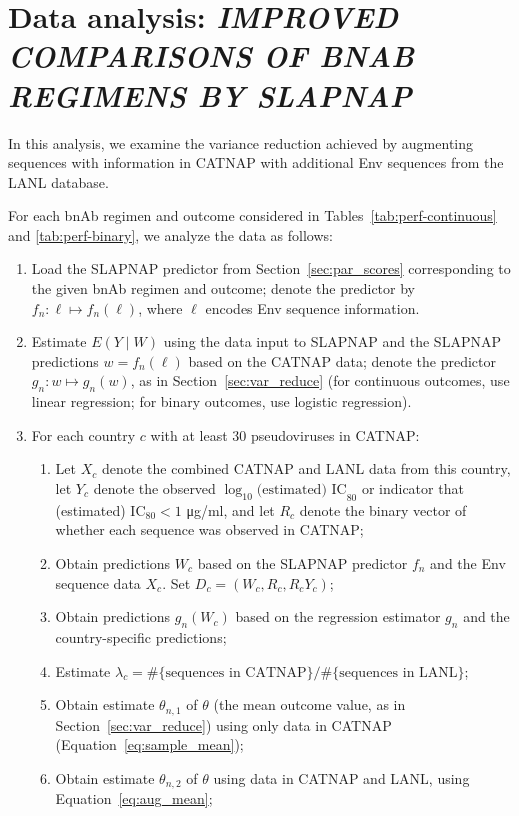 \documentclass[10pt]{article}
\begin{document}
\section{Data analysis: \textit{IMPROVED COMPARISONS OF BNAB REGIMENS BY SLAPNAP}}

In this analysis, we examine the variance reduction achieved by augmenting sequences with information in CATNAP with additional Env sequences from the LANL database.

For each bnAb regimen and outcome considered in Tables~\ref{tab:perf-continuous} and \ref{tab:perf-binary}, we analyze the data as follows:
\begin{enumerate}
  \item Load the SLAPNAP predictor from Section~\ref{sec:par_scores} corresponding to the given bnAb regimen and outcome; denote the predictor by $f_n: \ell \mapsto f_n(\ell)$, where $\ell$ encodes Env sequence information.
  \item Estimate $E(Y \mid W)$ using the data input to SLAPNAP and the SLAPNAP predictions $w = f_n(\ell)$ based on the CATNAP data; denote the predictor $g_n: w \mapsto g_n(w)$, as in Section~\ref{sec:var_reduce} (for continuous outcomes, use linear regression; for binary outcomes, use logistic regression).
  \item For each country $c$ with at least 30 pseudoviruses in CATNAP:
  \begin{enumerate}
    \item Let $X_c$ denote the combined CATNAP and LANL data from this country, let $Y_c$ denote the observed $\log_{10} \text{(estimated) IC}_{80}$ or indicator that (estimated) IC$_{80} < 1$ \si{\ug}/ml, and let $R_c$ denote the binary vector of whether each sequence was observed in CATNAP;
    \item Obtain predictions $W_c$ based on the SLAPNAP predictor $f_n$ and the Env sequence data $X_c$. Set $D_c = (W_c, R_c, R_cY_c)$;
    \item Obtain predictions $g_n(W_c)$ based on the regression estimator $g_n$ and the country-specific predictions;
    \item Estimate $\lambda_c = \#\{\text{sequences in CATNAP}\} / \#\{\text{sequences in LANL}\}$;
    \item Obtain estimate $\theta_{n,1}$ of $\theta$ (the mean outcome value, as in Section~\ref{sec:var_reduce}) using only data in CATNAP (Equation~\ref{eq:sample_mean});
    \item Obtain estimate $\theta_{n,2}$ of $\theta$ using data in CATNAP and LANL, using Equation~\eqref{eq:aug_mean};

\end{enumerate}
\end{enumerate}
\end{document}

